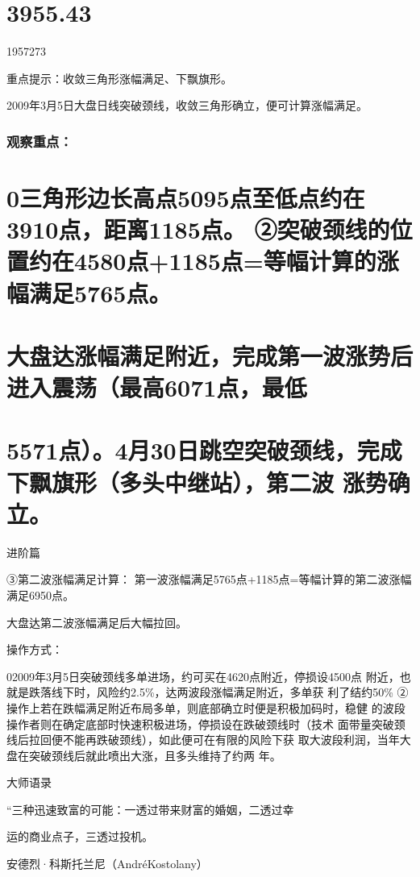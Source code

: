 \documentclass{article}
\begin{document}
\section{3955.43}

1957273

重点提示：收敛三角形涨幅满足、下飘旗形。

2009年3月5日大盘日线突破颈线，收敛三角形确立，便可计算涨幅满足。

\subsubsection{观察重点：}

\section{0三角形边长高点5095点至低点约在3910点，距离1185点。 ②突破颈线的位置约在4580点+1185点=等幅计算的涨幅满足5765点。}

\section{大盘达涨幅满足附近，完成第一波涨势后进入震荡（最高6071点，最低}

\section{5571点）。4月30日跳空突破颈线，完成下飘旗形（多头中继站），第二波 涨势确立。}

\clearpage

进阶篇

③第二波涨幅满足计算： 第一波涨幅满足5765点+1185点=等幅计算的第二波涨幅满足6950点。

大盘达第二波涨幅满足后大幅拉回。

操作方式：

02009年3月5日突破颈线多单进场，约可买在4620点附近，停损设4500点 附近，也就是跌落线下时，风险约2.5\%，达两波段涨幅满足附近，多单获 利了结约50\% ②操作上若在跌幅满足附近布局多单，则底部确立时便是积极加码时，稳健 的波段操作者则在确定底部时快速积极进场，停损设在跌破颈线时（技术 面带量突破颈线后拉回便不能再跌破颈线），如此便可在有限的风险下获 取大波段利润，当年大盘在突破颈线后就此喷出大涨，且多头维持了约两 年。

大师语录

“三种迅速致富的可能：一透过带来财富的婚姻，二透过幸

运的商业点子，三透过投机。

安德烈·科斯托兰尼（AndréKostolany）
\end{document}
